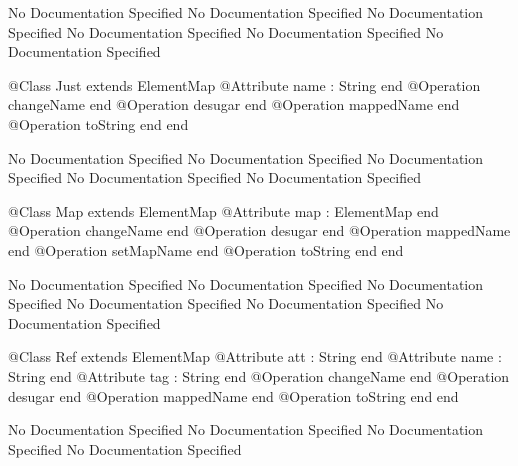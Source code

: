 No Documentation Specified
No Documentation Specified
No Documentation Specified
No Documentation Specified
No Documentation Specified
No Documentation Specified
\begin{Interface}
@Class Just extends ElementMap
  @Attribute name : String end
  @Operation changeName end
  @Operation desugar end
  @Operation mappedName end
  @Operation toString end
end
\end{Interface}
No Documentation Specified
No Documentation Specified
No Documentation Specified
No Documentation Specified
No Documentation Specified
\begin{Interface}
@Class Map extends ElementMap
  @Attribute map : ElementMap end
  @Operation changeName end
  @Operation desugar end
  @Operation mappedName end
  @Operation setMapName end
  @Operation toString end
end
\end{Interface}
No Documentation Specified
No Documentation Specified
No Documentation Specified
No Documentation Specified
No Documentation Specified
No Documentation Specified
\begin{Interface}
@Class Ref extends ElementMap
  @Attribute att : String end
  @Attribute name : String end
  @Attribute tag : String end
  @Operation changeName end
  @Operation desugar end
  @Operation mappedName end
  @Operation toString end
end
\end{Interface}
No Documentation Specified
No Documentation Specified
No Documentation Specified
No Documentation Specified

